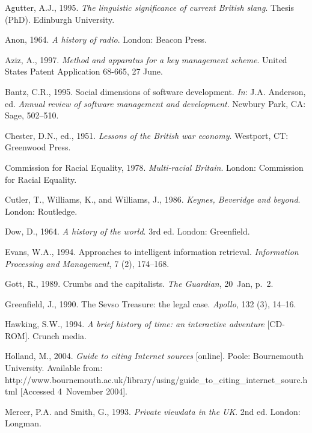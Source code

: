 \documentclass[]{interact}
\theoremstyle{plain}%
\theoremstyle{definition}
\theoremstyle{remark}
\begin{document}
\begin{thebibliography}{}

Agutter, A.J., 1995. \emph{The linguistic significance of current British
  slang}. Thesis (PhD). Edinburgh University.

Anon, 1964. \emph{A history of radio}. London: Beacon Press.

Aziz, A., 1997. \emph{Method and apparatus for a key management scheme}. United
  States Patent Application 68-665, 27 June.

Bantz, C.R., 1995. Social dimensions of software development. \emph{In}: J.A.
  Anderson, ed. \emph{Annual review of software management and development}.
  Newbury Park, CA: Sage, 502--510.

Chester, D.N., ed., 1951. \emph{Lessons of the British war economy}. Westport,
  CT: Greenwood Press.

Commission for Racial Equality, 1978. \emph{Multi-racial Britain}. London:
  Commission for Racial Equality.

Cutler, T., Williams, K., and Williams, J., 1986. \emph{Keynes, Beveridge and
  beyond}. London: Routledge.

Dow, D., 1964. \emph{A history of the world}. 3rd ed. London: Greenfield.

Evans, W.A., 1994. Approaches to intelligent information retrieval.
  \emph{Information Processing and Management}, 7 (2), 174--168.

Gott, R., 1989. Crumbs and the capitalists. \emph{The Guardian}, 20~Jan, p.~2.

Greenfield, J., 1990. The Sevso Treasure: the legal case. \emph{Apollo},
  132 (3), 14--16.

Hawking, S.W., 1994. \emph{A brief history of time: an interactive adventure}
  [CD-ROM]. Crunch media.

Holland, M., 2004. \emph{Guide to citing Internet sources} [online]. Poole:
  Bournemouth University. Available from:
  http://www.bournemouth.ac.uk/library/using/guide\_to\_citing\_internet\_sourc.html
  [Accessed 4~November 2004].

Mercer, P.A. and Smith, G., 1993. \emph{Private viewdata in the UK}. 2nd ed.
  London: Longman.


\end{thebibliography}
\end{document}
